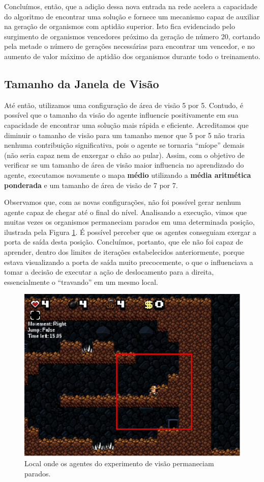 Concluímos, então, que a adição dessa nova entrada na rede acelera a capacidade
do algoritmo de encontrar uma solução e fornece um mecanismo capaz de auxiliar
na geração de organismos com aptidão superior. Isto fica evidenciado pelo
surgimento de organismos vencedores próximo da geração de número 20, cortando
pela metade o número de gerações necessárias para encontrar um vencedor, e no
aumento de valor máximo de aptidão dos organismos durante todo o treinamento. 

\subsection{\label{section:experiment-vision}Tamanho da Janela de Visão}

Até então, utilizamos uma configuração de área de visão 5 por 5. Contudo, é
possível que o tamanho da visão do agente influencie positivamente em sua
capacidade de encontrar uma solução mais rápida e eficiente. Acreditamos que
diminuir o tamanho de visão para um tamanho menor que 5 por 5 não traria nenhuma
contribuição significativa, pois o agente se tornaria ``míope'' demais (não
seria capaz nem de enxergar o chão ao pular). Assim, com o objetivo de verificar
se um tamanho de área de visão maior influencia no aprendizado do agente,
executamos novamente o mapa \textbf{médio} utilizando a \textbf{média aritmética
ponderada} e um tamanho de área de visão de 7 por 7.

Observamos que, com as novas configurações, não foi possível gerar nenhum agente
capaz de chegar até o final do nível. Analisando a execução, vimos que muitas
vezes os organismos permaneciam parados em uma determinada posição, ilustrada
pela Figura \ref{fig:experiment-medium-stuck}. É possível perceber que os
agentes conseguiam exergar a porta de saída desta posição. Concluímos, portanto,
que ele não foi capaz de aprender, dentro dos limites de iterações estabelecidos
anteriormente, porque estava visualizando a porta de saída muito precocemente, o
que o influenciava a tomar a decisão de executar a ação de deslocamento para a
direita, essencialmente o ``travando'' em um mesmo local.

\begin{figure}[htb!]
\centering
\includegraphics[width=.5\textwidth]{fig/medium-7x7-stuck.pdf}
\caption{Local onde os agentes do experimento de visão permaneciam parados.}
\label{fig:experiment-medium-stuck}
\end{figure}

